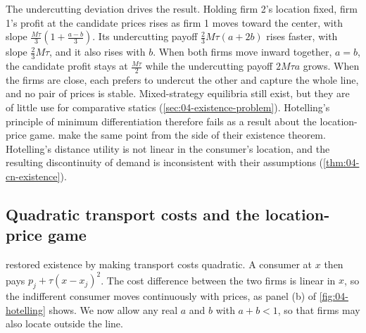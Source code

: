The undercutting deviation drives the result. Holding firm 2's location fixed, firm 1's profit at the candidate
prices rises as firm 1 moves toward the center, with slope $\frac{M\tau}{3}(1 + \frac{a - b}{3})$. Its undercutting
payoff $\frac{2}{3}M\tau(a + 2b)$ rises faster, with slope $\frac{2}{3}M\tau$, and it also rises with $b$. When both
firms move inward together, $a = b$, the candidate profit stays at $\frac{M\tau}{2}$ while the undercutting payoff
$2M\tau a$ grows. When the firms are close, each prefers to undercut
the other and capture the whole line, and no pair of prices is stable. Mixed-strategy equilibria still exist, but
they are of little use for comparative statics (\cref{sec:04-existence-problem}). Hotelling's principle of minimum
differentiation therefore fails as a result about the location-price game.  make the same
point from the side of their existence theorem. Hotelling's distance utility is not linear in the consumer's
location, and the resulting discontinuity of demand is inconsistent with their assumptions (\cref{thm:04-cn-existence}).

\subsection{Quadratic transport costs and the location-price game}\label{sec:04-hotelling-quad}

 restored existence by making transport costs quadratic. A consumer at $x$
then pays $p_j + \tau(x - x_j)^2$. The cost difference between the two firms is linear in $x$, so the
indifferent consumer moves continuously with prices, as panel (b) of \cref{fig:04-hotelling} shows. We now allow any
real $a$ and $b$ with $a + b < 1$, so that firms may also locate outside the line.

